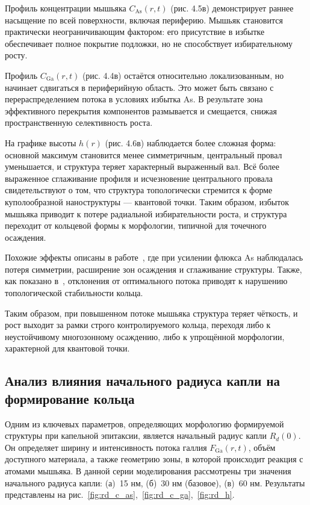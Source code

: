 \documentclass[14pt,oneside]{extarticle}
\begin{document}
Профиль концентрации мышьяка $C_\mathrm{As}(r, t)$ (рис. 4.5в) демонстрирует раннее насыщение по всей поверхности, включая периферию. Мышьяк становится практически неограничивающим фактором: его присутствие в избытке обеспечивает полное покрытие подложки, но не способствует избирательному росту.

Профиль $C_\mathrm{Ga}(r, t)$ (рис. 4.4в) остаётся относительно локализованным, но начинает сдвигаться в периферийную область. Это может быть связано с перераспределением потока в условиях избытка As. В результате зона эффективного перекрытия компонентов размывается и смещается, снижая пространственную селективность роста.

На графике высоты $h(r)$ (рис. 4.6в) наблюдается более сложная форма: основной максимум становится менее симметричным, центральный провал уменьшается, и структура теряет характерный выраженный вал. Всё более выраженное сглаживание профиля и исчезновение центрального провала свидетельствуют о том, что структура топологически стремится к форме куполообразной наноструктуры — квантовой точки. Таким образом, избыток мышьяка приводит к потере радиальной избирательности роста, и структура переходит от кольцевой формы к морфологии, типичной для точечного осаждения.

Похожие эффекты описаны в работе~\cite{fan2023evaporation}, где при усилении флюкса As наблюдалась потеря симметрии, расширение зон осаждения и сглаживание структуры. Также, как показано в~\cite{mano2005nano}, отклонения от оптимального потока приводят к нарушению топологической стабильности кольца.

Таким образом, при повышенном потоке мышьяка структура теряет чёткость, и рост выходит за рамки строго контролируемого кольца, переходя либо к неустойчивому многозонному осаждению, либо к упрощённой морфологии, характерной для квантовой точки.

\subsection{Анализ влияния начального радиуса капли на формирование кольца}

Одним из ключевых параметров, определяющих морфологию формируемой структуры при капельной эпитаксии, является начальный радиус капли \( R_d(0) \). Он определяет ширину и интенсивность потока галлия \( F_{\text{Ga}}(r, t) \), объём доступного материала, а также геометрию зоны, в которой происходит реакция с атомами мышьяка. В данной серии моделирования рассмотрены три значения начального радиуса капли: (а)~15 нм, (б)~30 нм (базовое), (в)~60 нм. Результаты представлены на рис.~\ref{fig:rd_c_as},~\ref{fig:rd_c_ga},~\ref{fig:rd_h}.
\end{document}
